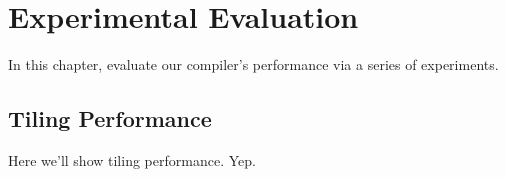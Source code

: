 \chapter{Experimental Evaluation\label{chap:evaluation}}

In this chapter, evaluate our compiler's performance via a series of experiments.

\section{Tiling Performance}

Here we'll show tiling performance.  Yep.

